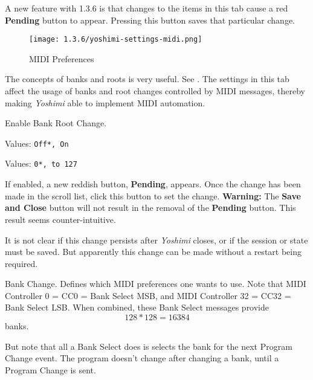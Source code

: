    A new feature with 1.3.6 is that changes to the items in this
   tab cause a red \textbf{Pending} button to appear.  Pressing this
   button saves that particular change.

\begin{figure}[H]
   \centering 
   \texttt{[image: 1.3.6/yoshimi-settings-midi.png]}
   \caption[MIDI Preferences]{MIDI Preferences}
   \label{fig:yoshimi_settings_cc}
\end{figure}

   \setcounter{ItemCounter}{0}      %

   The concepts of banks and roots is very useful.
   See .
   The settings in this tab affect the usage of banks and root changes
   controlled by MIDI messages, thereby making \textsl{Yoshimi} able to
   implement MIDI automation.

   Enable Bank Root Change.

   Values: \texttt{Off*, On}


   Values: \texttt{0*, to 127}

   If enabled, a new reddish button, \textbf{Pending}, appears.
   Once the change has been made in the scroll list, click this button
   to set the change.
   \textbf{Warning:}
   The \textbf{Save and Close} button will not result in the removal of the
   \textbf{Pending} button.  This result seems counter-intuitive.

   It is not clear if this change persists after \textsl{Yoshimi} closes, or
   if the session or state must be saved.
   But apparently this change can be made without a restart being required.

   Bank Change.
   Defines which MIDI preferences one wants to use.
   Note that MIDI Controller 0 = CC0 = Bank Select MSB, and MIDI Controller
   32 = CC32 = Bank Select LSB.
   When combined, these Bank Select messages provide \[128*128 = 16384\]
   banks.

   But note that all a Bank Select does is selects the bank for the next
   Program Change event.  The program doesn't change after changing a bank,
   until a Program Change is sent.

